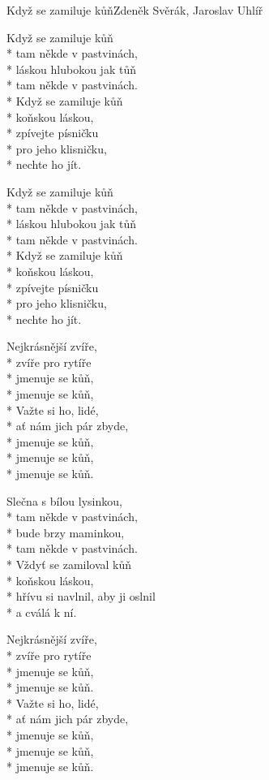 \documentclass[10.5pt]{book}
\begin{document}
\begin{poem}{Když se zamiluje kůň}{Zdeněk Svěrák, Jaroslav Uhlíř}

\settowidth{\versewidth}{láskou hlubokou jak tůň}

Když se zamiluje kůň\\*
tam někde v pastvinách,\\*
láskou hlubokou jak tůň\\*
tam někde v pastvinách.\\*
Když se zamiluje kůň\\*
koňskou láskou,\\*
zpívejte písničku\\*
pro jeho klisničku,\\*
nechte ho jít.

Když se zamiluje kůň\\*
tam někde v pastvinách,\\*
láskou hlubokou jak tůň\\*
tam někde v pastvinách.\\*
Když se zamiluje kůň\\*
koňskou láskou,\\*
zpívejte písničku\\*
pro jeho klisničku,\\*
nechte ho jít.

Nejkrásnější zvíře,\\*
zvíře pro rytíře\\*
jmenuje se kůň,\\*
jmenuje se kůň,\\*
Važte si ho, lidé,\\*
ať nám jich pár zbyde,\\*
jmenuje se kůň,\\*
jmenuje se kůň,\\*
jmenuje se kůň.

Slečna s bílou lysinkou,\\*
tam někde v pastvinách,\\*
bude brzy maminkou,\\*
tam někde v pastvinách.\\*
Vždyť se zamiloval kůň\\*
koňskou láskou,\\*
hřívu si navlnil, aby ji oslnil\\*
a cválá k ní.

Nejkrásnější zvíře,\\*
zvíře pro rytíře\\*
jmenuje se kůň,\\*
jmenuje se kůň.\\*
Važte si ho, lidé,\\*
ať nám jich pár zbyde,\\*
jmenuje se kůň,\\*
jmenuje se kůň,\\*
jmenuje se kůň.


\end{poem}
\end{document}
